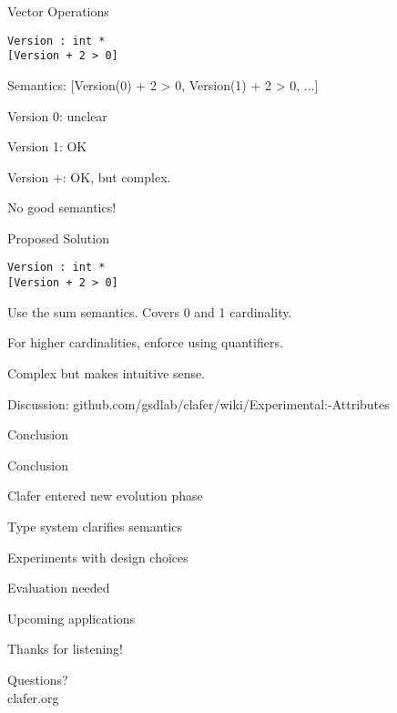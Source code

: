\documentclass[table,15pt,t]{beamer}
\newcommand{\vmiddle}[1]{
  \vspace{\stretch{1}}
  #1
  \vspace{\stretch{1}}
}
\newcommand{\interframe}[1]{
\begin{frame}{}
\vmiddle{\hmiddle{\Huge #1}}
\end{frame}
}
\newcommand{\mlist}[1]{
\vmiddle{
  \begin{list}{}{}
    #1
  \end{list}
  }
}
\newcommand{\hmiddle}[1]{
  \begin{center}#1\end{center}
}
\begin{document}
\begin{frame}[fragile,c]{Vector Operations}
\begin{lstlisting}
Version : int *
[Version + 2 > 0]
\end{lstlisting}
\begin{list}{}{}
    \item Semantics: [Version(0) + 2 > 0, Version(1) + 2 > 0, ...]\pause
    \item Version 0: unclear
    \item Version 1: OK
    \item Version +: OK, but complex.
\end{list}
\end{frame}

\interframe{No good semantics!}

\begin{frame}[fragile,c]{Proposed Solution}
\begin{lstlisting}
Version : int *
[Version + 2 > 0]
\end{lstlisting}
\begin{list}{}{}
    \item Use the sum semantics. Covers 0 and 1 cardinality.
    \item For higher cardinalities, enforce using quantifiers.
    \item Complex but makes intuitive sense.
    \item Discussion: github.com/gsdlab/clafer/wiki/Experimental:-Attributes
\end{list}
\end{frame}

\interframe{Conclusion}

\begin{frame}{Conclusion}
 \mlist{
    \item Clafer entered new evolution phase
    \item Type system clarifies semantics
    \item Experiments with design choices
    \item Evaluation needed
    \item Upcoming applications
 }
\end{frame}

\interframe{Thanks for listening!}

\interframe{Questions?\\[1cm]\normalsize{\textsf{clafer.org}}}
\end{document}
